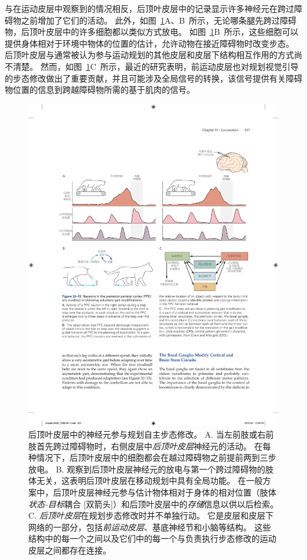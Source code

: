 与在运动皮层中观察到的情况相反，后顶叶皮层中的记录显示许多神经元在跨过障碍物之前增加了它们的活动。
此外，如图~\ref{fig:33_15}A、B~所示，无论哪条腿先跨过障碍物，后顶叶皮层中的许多细胞都以类似方式放电。
如图~\ref{fig:33_15}B~所示，这些细胞可以提供身体相对于环境中物体的位置的估计，允许动物在接近障碍物时改变步态。
后顶叶皮层与通常被认为参与运动规划的其他皮层和皮层下结构相互作用的方式尚不清楚。
然而，如图~\ref{fig:33_15}C~所示，最近的研究表明，前运动皮层也对规划视觉引导的步态修改做出了重要贡献，并且可能涉及全局信号的转换，该信号提供有关障碍物位置的信息到跨越障碍物所需的基于肌肉的信号。


\begin{figure}[htbp]
	\centering
	\includegraphics[width=1.0\linewidth]{chap33/fig_33_15}
	\caption{后顶叶皮层中的神经元参与规划自主步态修改。
		A. 当左前肢或右前肢首先跨过障碍物时，右侧皮层中\textit{后顶叶皮层}神经元的活动。
		在每种情况下，后顶叶皮层中的细胞都会在越过障碍物之前提前两到三步放电。
		B. 观察到后顶叶皮层神经元的放电与第一个跨过障碍物的肢体无关，这表明后顶叶皮层在移动规划中具有全局功能。
		在一般方案中，后顶叶皮层神经元参与估计物体相对于身体的相对位置（肢体\textit{状态-目标}耦合 [双箭头]）和后顶叶皮层中的\textit{存储}信息以供以后检索。
		C. \textit{后顶叶皮层}在规划步态修改时并不单独行动。
		它是皮层和皮层下网络的一部分，包括\textit{前运动皮层}、基底神经节和小脑等结构。
		这些结构中的每一个之间以及它们中的每一个与负责执行步态修改的运动皮层之间都存在连接\cite{drew2015taking}。}
	\label{fig:33_15}
\end{figure}


